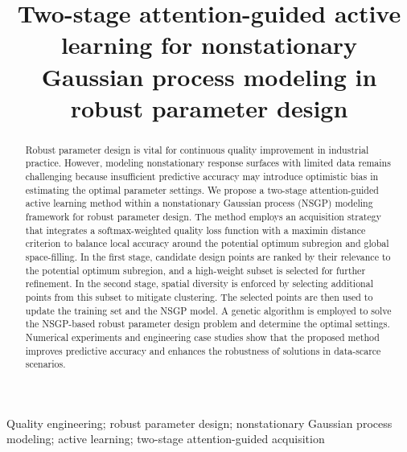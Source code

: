 \documentclass[]{interact}
\theoremstyle{plain}%
\theoremstyle{definition}
\theoremstyle{remark}
\begin{document}

\title{Two-stage attention-guided active learning for nonstationary Gaussian process modeling in robust parameter design}

\author{
}

\maketitle

\begin{abstract}
Robust parameter design is vital for continuous quality improvement in industrial practice. However, modeling nonstationary response surfaces with limited data remains challenging because insufficient predictive accuracy may introduce optimistic bias in estimating the optimal parameter settings. We propose a two-stage attention-guided active learning method within a nonstationary Gaussian process (NSGP) modeling framework for robust parameter design. The method employs an acquisition strategy that integrates a softmax-weighted quality loss function with a maximin distance criterion to balance local accuracy around the potential optimum subregion and global space-filling. In the first stage, candidate design points are ranked by their relevance to the potential optimum subregion, and a high-weight subset is selected for further refinement. In the second stage, spatial diversity is enforced by selecting additional points from this subset to mitigate clustering. The selected points are then used to update the training set and the NSGP model. A genetic algorithm is employed to solve the NSGP-based robust parameter design problem and determine the optimal settings. Numerical experiments and engineering case studies show that the proposed method improves predictive accuracy and enhances the robustness of solutions in data-scarce scenarios.
\end{abstract}

\begin{keywords}
Quality engineering; robust parameter design; nonstationary Gaussian process modeling; active learning; two-stage attention-guided acquisition
\end{keywords}
\end{document}
